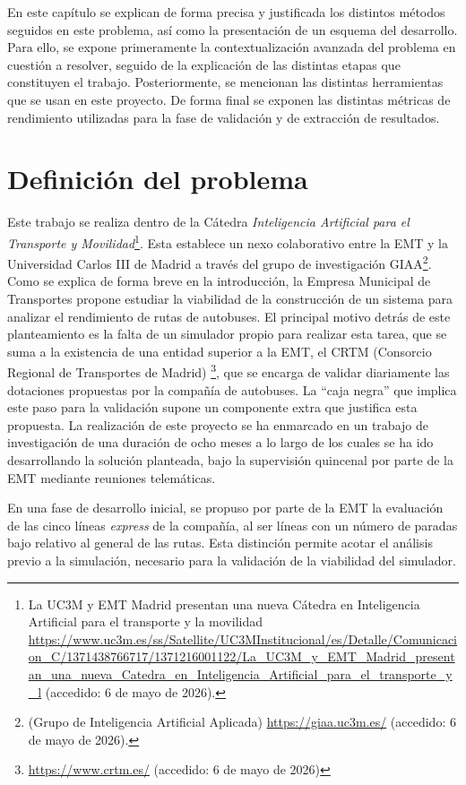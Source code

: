 En este capítulo se explican de forma precisa y justificada los distintos métodos seguidos 
en este problema, así como la presentación de un esquema del desarrollo. Para ello, se expone 
primeramente la contextualización avanzada del problema en cuestión a resolver, seguido de la 
explicación de las distintas etapas que constituyen el trabajo. Posteriormente, se mencionan 
las distintas herramientas que se usan en este proyecto. De forma final se exponen las distintas
métricas de rendimiento utilizadas para la fase de validación y de extracción de resultados.

\section{Definición del problema}\label{section:problem_def}
Este trabajo se realiza dentro de la Cátedra 
\textit{Inteligencia Artificial para el Transporte y Movilidad}\footnote{La UC3M y 
EMT Madrid presentan una nueva Cátedra en Inteligencia Artificial para el transporte y 
la movilidad \url{https://www.uc3m.es/ss/Satellite/UC3MInstitucional/es/Detalle/Comunicacion_C/1371438766717/1371216001122/La_UC3M_y_EMT_Madrid_presentan_una_nueva_Catedra_en_Inteligencia_Artificial_para_el_transporte_y_l} 
(accedido: 6 de mayo de 2026).}. Esta establece un nexo colaborativo entre la EMT y la Universidad Carlos III de Madrid
a través del grupo de investigación GIAA\footnote{(Grupo de Inteligencia Artificial Aplicada) 
\url{https://giaa.uc3m.es/} (accedido: 6 de mayo de 2026).}. Como se explica de forma breve en 
la introducción, la Empresa Municipal de Transportes propone estudiar la viabilidad de la construcción 
de un sistema para analizar el rendimiento de rutas de autobuses. El principal motivo detrás de este 
planteamiento es la falta de un simulador propio para realizar esta tarea, que se suma a la existencia 
de  una entidad superior a la EMT, el CRTM (Consorcio Regional de Transportes de Madrid) 
\footnote{\url{https://www.crtm.es/}  (accedido: 6 de mayo de 2026)}, que se encarga de validar 
diariamente las dotaciones propuestas por la compañía de autobuses. La \enquote{caja negra} que 
implica este paso para la validación supone un componente extra que justifica esta propuesta. La 
realización de este proyecto se ha enmarcado en un trabajo de investigación de una duración de ocho 
meses a lo largo de los cuales se ha ido desarrollando la solución planteada, bajo la supervisión 
quincenal por parte de la EMT mediante reuniones telemáticas.

En una fase de desarrollo inicial, se propuso por parte de la EMT la evaluación de las cinco 
líneas \textit{express} de la compañía, al ser líneas con un número de paradas bajo relativo al 
general de las rutas. Esta distinción permite acotar el análisis previo a la simulación, necesario para 
la validación de la viabilidad del simulador.

